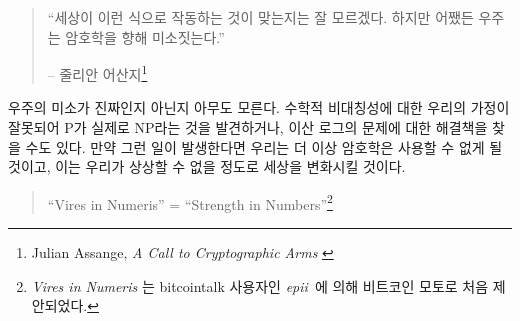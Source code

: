 \begin{comment}
\begin{quotation}\begin{samepage}
\enquote{It isn't obvious that the world had to work this way. But somehow the
universe smiles on encryption.}
\begin{flushright} -- Julian Assange\footnote{Julian Assange, \textit{A Call to Cryptographic Arms} \cite{call-to-cryptographic-arms}}
\end{flushright}\end{samepage}\end{quotation}
\end{comment}
\begin{quotation}\begin{samepage}
		\enquote{세상이 이런 식으로 작동하는 것이 맞는지는 잘 모르겠다. 하지만 어쨌든 우주는 암호학을 향해 미소짓는다.}
		\begin{flushright} -- 줄리안 어산지\footnote{Julian Assange, \textit{A Call to Cryptographic Arms} \cite{call-to-cryptographic-arms}}
\end{flushright}\end{samepage}\end{quotation}

\begin{comment}
Nobody yet knows for sure if the universe's smile is genuine or not. It
is possible that our assumption of mathematical asymmetries is wrong and
we find that P actually equals NP \cite{wiki:pnp}, or we find surprisingly quick
solutions to specific problems \cite{wiki:discrete-log} which we currently assume to be hard.
If that should be the case, cryptography as we know it will cease to
exist, and the implications would most likely change the world beyond
recognition.
\end{comment}
우주의 미소가 진짜인지 아닌지 아무도 모른다. 
수학적 비대칭성에 대한 우리의 가정이 잘못되어 P가 실제로 NP\cite{wiki:pnp}라는 것을 발견하거나, 이산 로그의 문제\cite{wiki:discrete-log}에 대한 해결책을 찾을 수도 있다. 
만약 그런 일이 발생한다면 우리는 더 이상 암호학은 사용할 수 없게 될 것이고, 
이는 우리가 상상할 수 없을 정도로 세상을 변화시킬 것이다.

\begin{quotation}\begin{samepage}
\enquote{Vires in Numeris} = \enquote{Strength in Numbers}\footnote{\textit{Vires in Numeris} 는 bitcointalk 사용자인 \textit{epii}~\cite{epii}에 의해 
	비트코인 모토로 처음 제안되었다.}
\end{samepage}\end{quotation}

